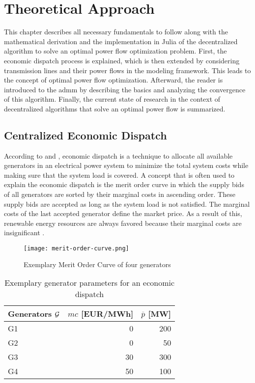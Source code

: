 \section{Theoretical Approach}
\label{sec:theo}

This chapter describes all necessary fundamentals to follow along with the mathematical derivation and the implementation in Julia of the decentralized algorithm to solve an optimal power flow optimization problem. First, the economic dispatch process is explained, which is then extended by considering transmission lines and their power flows in the modeling framework. This leads to the concept of optimal power flow optimization. Afterward, the reader is introduced to the \gls{admm} by describing the basics and analyzing the convergence of this algorithm. Finally, the current state of research in the context of decentralized algorithms that solve an optimal power flow is summarized.

\subsection{Centralized Economic Dispatch}
\label{sec:theo:ed}

According to \citet{chowdhury1990} and \citet{hetzer2008}, economic dispatch is a technique to allocate all available generators in an electrical power system to minimize the total system costs while making sure that the system load is covered. A concept that is often used to explain the economic dispatch is the merit order curve in which the supply bids of all generators are sorted by their marginal costs in ascending order. These supply bids are accepted as long as the system load is not satisfied. The marginal costs of the last accepted generator define the market price. As a result of this, renewable energy resources are always favored because their marginal costs are insignificant \citep{hetzer2008}. \\

\begin{figure}[h!]
	\centering
	\texttt{[image: merit-order-curve.png]}
	\caption{Exemplary Merit Order Curve of four generators}
	\label{fig:merit}
\end{figure}

\begin{table}[h!]
    \centering
    \begin{tabular}{lrr}
        Generators $\mathcal{G}$ & $mc$ [EUR/MWh] & $\overline{p}$ [MW] \\ \toprule
        G1 & 0 & 200 \\
        G2 & 0 & 50 \\
        G3 & 30 & 300 \\
        G4 & 50 & 100 \\
        \bottomrule
    \end{tabular}
    \caption{Exemplary generator parameters for an economic dispatch} \label{tab:theo:gen-params}
\end{table}

